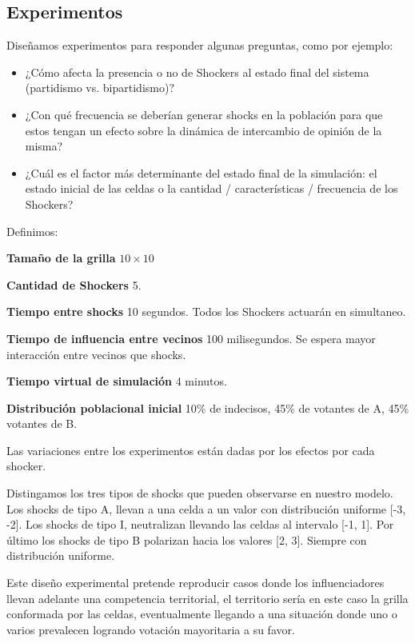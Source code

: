 \subsection{Experimentos}

Diseñamos experimentos para responder algunas preguntas, como por ejemplo:
\begin{itemize}
\item ¿Cómo afecta la presencia o no de Shockers al estado final del sistema (partidismo vs. bipartidismo)$?$ 
\item ¿Con qué frecuencia se deberían generar shocks en la población para que estos tengan un efecto sobre la dinámica de intercambio de opinión de la misma?
\item ¿Cuál es el factor más determinante del estado final de la simulación: el estado inicial de las celdas o la cantidad / características / frecuencia de los Shockers?
\end{itemize}

Definimos:

\begin{description}
    \item \textbf{Tamaño de la grilla}  $10 \times 10$
    \item \textbf{Cantidad de Shockers} 5.
    \item \textbf{Tiempo entre shocks} 10 segundos. Todos los Shockers actuarán en simultaneo.
    \item \textbf{Tiempo de influencia entre vecinos} 100 milisegundos. Se espera mayor interacción entre vecinos que shocks.
    \item \textbf{Tiempo virtual de simulación} 4 minutos.
    \item \textbf{Distribución poblacional inicial} 10\% de indecisos, 45\% de votantes de A, 45\% votantes de B.
\end{description}

Las variaciones entre los experimentos están dadas por los efectos por cada shocker.

Distingamos los tres tipos de shocks que pueden observarse en nuestro modelo.
Los shocks de tipo A, llevan a una celda a un valor con distribución
uniforme [-3, -2]. Los shocks de tipo I, neutralizan
llevando las celdas al intervalo  [-1, 1]. Por último los shocks de tipo B
polarizan hacia los valores [2, 3]. Siempre con distribución uniforme.

Este diseño experimental pretende reproducir casos donde los influenciadores
llevan adelante una competencia territorial, el territorio sería en este caso la grilla conformada por las celdas, eventualmente llegando a una
situación donde uno o varios prevalecen logrando votación mayoritaria a su favor.

